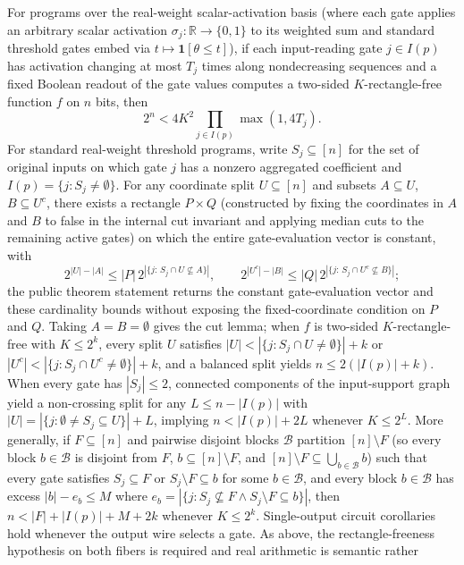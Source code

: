 \begin{result}
For programs over the real-weight scalar-activation basis (where each gate
applies an arbitrary scalar activation $\sigma_j:\mathbb R\to\{0,1\}$ to its
weighted sum and standard threshold gates embed via $t\mapsto\mathbf 1[\theta\le t]$),
if each input-reading gate $j\in I(p)$ has activation changing at most $T_j$
times along nondecreasing sequences and a fixed Boolean readout of the gate
values computes a two-sided $K$-rectangle-free function $f$ on $n$ bits, then
\[
2^n < 4K^2\prod_{j\in I(p)}\max(1,4T_j).
\]
For standard real-weight threshold programs, write $S_j\subseteq[n]$ for the
set of original inputs on which gate $j$ has a nonzero aggregated coefficient
and $I(p)=\{j:S_j\ne\emptyset\}$. For any coordinate split $U\subseteq[n]$ and
subsets $A\subseteq U$, $B\subseteq U^c$, there exists a rectangle $P\times Q$
(constructed by fixing the coordinates in $A$ and $B$ to false in the internal
cut invariant and applying median cuts to the remaining active gates) on which
the entire gate-evaluation vector is constant, with
\[
2^{|U|-|A|}\le |P|\,2^{|\{j:\,S_j\cap U\not\subseteq A\}|},
\qquad
2^{|U^c|-|B|}\le |Q|\,2^{|\{j:\,S_j\cap U^c\not\subseteq B\}|};
\]
the public theorem statement returns the constant gate-evaluation vector and
these cardinality bounds without exposing the fixed-coordinate condition on $P$
and $Q$. Taking $A=B=\emptyset$ gives the cut lemma; when $f$ is two-sided
$K$-rectangle-free with $K\le 2^k$, every split $U$ satisfies
$|U|<|\{j:S_j\cap U\ne\emptyset\}|+k$ or
$|U^c|<|\{j:S_j\cap U^c\ne\emptyset\}|+k$, and a balanced split yields
$n\le 2(|I(p)|+k)$. When every gate has $|S_j|\le 2$, connected components of
the input-support graph yield a non-crossing split for any $L\le n-|I(p)|$
with $|U|=|\{j:\emptyset\ne S_j\subseteq U\}|+L$, implying $n<|I(p)|+2L$
whenever $K\le 2^L$. More generally, if $F\subseteq[n]$ and pairwise disjoint
blocks $\mathcal B$ partition $[n]\setminus F$ (so every block $b\in\mathcal B$
is disjoint from $F$, $b\subseteq[n]\setminus F$, and
$[n]\setminus F\subseteq\bigcup_{b\in\mathcal B}b$) such that every gate
satisfies $S_j\subseteq F$ or $S_j\setminus F\subseteq b$ for some
$b\in\mathcal B$, and every block $b\in\mathcal B$ has excess $|b|-e_b\le M$
where $e_b=|\{j:S_j\not\subseteq F\wedge S_j\setminus F\subseteq b\}|$, then
$n<|F|+|I(p)|+M+2k$ whenever $K\le 2^k$. Single-output circuit corollaries hold
whenever the output wire selects a gate. As above, the rectangle-freeness
hypothesis on both fibers is required and real arithmetic is semantic rather

\end{result}
